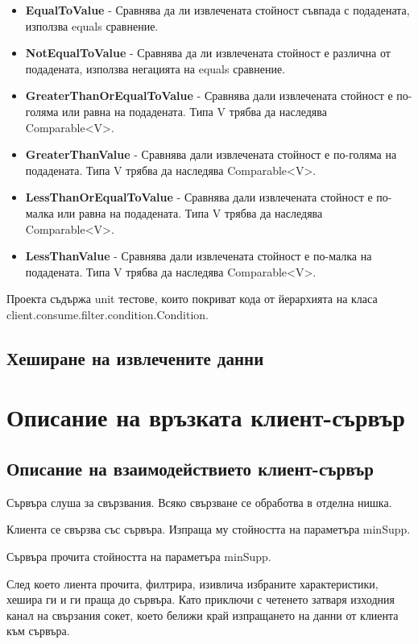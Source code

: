 \documentclass[a4paper, 12pt]{article}
\begin{document}
\begin{itemize}
\begin{itemize}
\begin{itemize}
\item \textbf{EqualToValue} - Сравнява да ли извлечената стойност съвпада с подадената, използва equals сравнение.
\item \textbf{NotEqualToValue} - Сравнява да ли извлечената стойност е различна от подадената,
използва негацията на equals сравнение.
\item \textbf{GreaterThanOrEqualToValue} - Сравнява дали извлечената стойност е по-голяма или равна на подадената.
Типа V трябва да наследява Comparable<V>.
\item \textbf{GreaterThanValue} - Сравнява дали извлечената стойност е по-голяма на подадената.
Типа V трябва да наследява Comparable<V>.
\item \textbf{LessThanOrEqualToValue} - Сравнява дали извлечената стойност е по-малка или равна на подадената.
Типа V трябва да наследява Comparable<V>.
\item \textbf{LessThanValue} - Сравнява дали извлечената стойност е по-малка на подадената.
Типа V трябва да наследява Comparable<V>.
\end{itemize}
\end{itemize}
\end{itemize}

Проекта съдържа unit тестове, които покриват кода от йерархията на класа client.consume.filter.condition.Condition.

\subsection{Хеширане на извлечените данни}

\section{Описание на връзката клиент-сървър}

\subsection{Описание на взаимодействието клиент-сървър}
Сървъра слуша за свързвания. Всяко свързване се обработва в отделна нишка.

Клиента се свързва със сървъра. Изпраща му стойността на параметъра minSupp.

Сървъра прочита стойността на параметъра minSupp.

След което лиента прочита, филтрира, изивлича избраните характеристики, хешира ги и ги праща до сървъра.
Като приключи с четенето затваря изходния канал на свързания сокет,
което белижи край изпращането на данни от клиента към сървъра.
\end{document}
